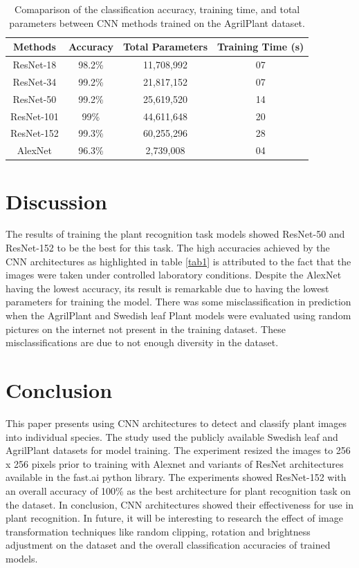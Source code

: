 \documentclass[conference]{IEEEtran}
\begin{document}
\begin{table}[htbp]
\caption{Comaparison of the classification accuracy, training time, and total parameters between CNN methods trained on the AgrilPlant dataset.}
\begin{center}
\begin{tabular}{c|c|c|c}

\textbf{Methods} & \textbf{Accuracy}& \textbf{Total Parameters}& \textbf{Training Time (s)} \\
\hline
ResNet-18 & 98.2\%& 11,708,992 & 07 \\
\hline
ResNet-34 & 99.2\%& 21,817,152 & 07 \\
\hline
ResNet-50 & 99.2\%& 25,619,520 & 14 \\
\hline
ResNet-101 & 99\%& 44,611,648 & 20 \\
\hline
ResNet-152 & 99.3\%& 60,255,296 & 28 \\
\hline
AlexNet & 96.3\%& 2,739,008 & 04 \\

\end{tabular}
\label{table:agril}
\end{center}
\end{table}
\section{Discussion}

The results of training the plant recognition task models showed ResNet-50 and ResNet-152 to be the best for this task. The high accuracies achieved by the CNN architectures as highlighted in table \ref{tab1} is attributed to the fact that the images were taken under controlled laboratory conditions. Despite the AlexNet having the lowest accuracy, its result is remarkable due to having the lowest parameters for training the model. There was some misclassification in prediction when the AgrilPlant and Swedish leaf Plant models were evaluated using random pictures on the internet not present in the training dataset. These misclassifications are due to not enough diversity in the dataset. 
\section{Conclusion}
This paper presents using CNN architectures to detect and classify plant images into individual species. The study used the publicly available Swedish leaf and AgrilPlant datasets for model training. The experiment resized the images to 256 x 256 pixels prior to training with Alexnet and variants of ResNet architectures available in the fast.ai python library. The experiments showed ResNet-152 with an overall accuracy of 100\% as the best architecture for plant recognition task on the dataset. In conclusion, CNN architectures showed their effectiveness for use in plant recognition.  In future, it will be interesting to research the effect of image transformation techniques like random clipping, rotation and brightness adjustment on the dataset and the overall classification accuracies of trained models.






\vspace{12pt}
\end{document}
